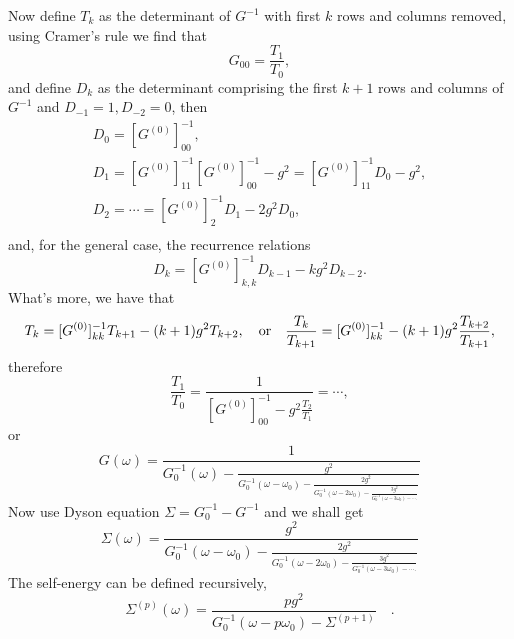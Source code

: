 \documentclass{book}
\numberwithin{equation}{section}
\begin{document}
Now define $T_k$ as the determinant of $G^{-1}$ with first $k$ rows
and columns removed, using Cramer's rule we find that
\begin{equation}
  G_{00}=\frac{T_1}{T_0},
\end{equation}
and define $D_k$ as the determinant comprising the first $k+1$ rows and
columns of $G^{-1}$ and $D_{-1}=1, D_{-2}=0$, then
\begin{equation}
  \begin{array}{l}
    D_0=[G^{(0)}]^{-1}_{00},\\
    D_1=[G^{(0)}]^{-1}_{11}[G^{(0)}]^{-1}_{00}-g^2
    =[G^{(0)}]^{-1}_{11}D_0-g^2,\\
    D_2=\cdots=[G^{(0)}]^{-1}_{2}D_1-2g^2D_0,\\
  \end{array}
\end{equation}
and, for the general case, the recurrence relations
\begin{equation}
  D_{k}=[G^{(0)}]^{-1}_{k,k}D_{k-1}-kg^2D_{k-2}.
\end{equation}
What's more, we have that
\begin{equation}
  T_k=[G^{(0)}]^{-1}_{kk}T_{k+1}-(k+1)g^2T_{k+2},\quad{\rm or}\quad
  \frac{T_k}{T_{k+1}}=[G^{(0)}]^{-1}_{kk}-(k+1)g^2\frac{T_{k+2}}{T_{k+1}},
\end{equation}
therefore
\begin{equation}
  \frac{T_1}{T_0}=\frac{1}{[G^{(0)}]^{-1}_{00}-g^2\frac{T_2}{T_1}}=\cdots,
\end{equation}
or
\begin{equation}
  G(\omega)=\frac{1}{\displaystyle G_0^{-1}(\omega)-
    \frac{g^2}{\displaystyle G_0^{-1}(\omega-\omega_0)-
      \frac{2g^2}{\displaystyle G_0^{-1}(\omega-2\omega_0)-
        \frac{3g^2}{\displaystyle G_0^{-1}(\omega-3\omega_0)-\cdots.}}}}
\end{equation}
Now use Dyson equation $\Sigma=G_0^{-1}-G^{-1}$ and we shall get
\begin{equation}
  \Sigma(\omega)=\frac{g^2}{\displaystyle G_0^{-1}(\omega-\omega_0)-
      \frac{2g^2}{\displaystyle G_0^{-1}(\omega-2\omega_0)-
        \frac{3g^2}{\displaystyle G_0^{-1}(\omega-3\omega_0)-\cdots.}}}
\end{equation}
The self-energy can be defined recursively,
\begin{equation}
  \Sigma^{(p)}(\omega)=\frac{pg^2}{G_0^{-1}(\omega-p\omega_0)-
    \Sigma^{(p+1)}}\quad.
\end{equation}
\end{document}
